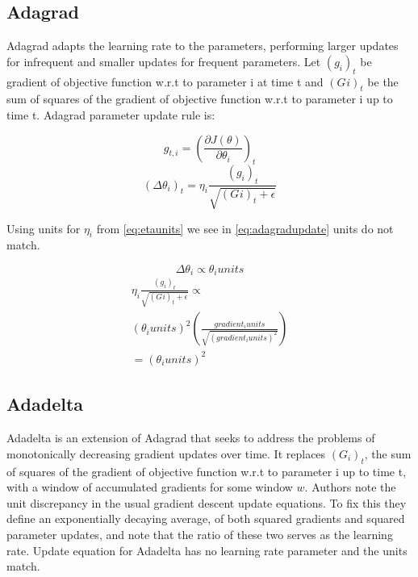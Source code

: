 \documentclass{article}
\begin{document}
\subsection{Adagrad}
	Adagrad \cite{journals/jmlr/DuchiHS11} adapts the learning rate to the parameters, performing larger updates for infrequent and smaller updates for frequent parameters. Let $(g_i)_{t}$ be gradient of objective function w.r.t to parameter i at time t and $(G_{}i)_{t}$ be the sum of squares of the gradient of objective function w.r.t to parameter i up to time t. Adagrad parameter update rule is:
	
	\begin{center} 
		\begin{equation} g_{t,i} =  (\frac {\partial J(\theta)} {\partial \theta_{i}})_{t}   \end{equation}  
		\begin{equation} (\Delta \theta_{i})_{t} = \eta_{i} \frac {(g_i)_{t}} {\sqrt{(G_{}i)_{t} + \epsilon}} 	\label{eq:adagradupdate} \end{equation}
    \end{center}	 
	
	Using units for $\eta_{i}$ from \ref{eq:etaunits} we see in \ref{eq:adagradupdate} units do not match.
	
	 \begin{center} 
	 	\begin{equation}  \Delta \theta_{i} \propto \theta_{i} units \end{equation}  
	 	\begin{equation} 
	 	\begin{split}
	 		\eta_{i} \frac {(g_i)_{t}} {\sqrt{(G_{}i)_{t} + \epsilon}} \propto \\
	 		(\theta_{i} units)^{2} (\frac{gradient_{i} units}{\sqrt{(gradient_{i} units)^{2}}}) \\
	 		= (\theta_{i} units)^{2} 
	 	\end{split}
	 	\end{equation}
	 \end{center}

\subsection{Adadelta}
	Adadelta \cite{DBLP:journals/corr/abs-1212-5701} is an extension of Adagrad that seeks to address the problems of monotonically decreasing gradient updates over time. It replaces $(G_{i})_{t}$, the sum of squares of the gradient of objective function w.r.t to parameter i up to time t, with a window of accumulated gradients for some window $w$. Authors note the unit discrepancy in the usual gradient descent update equations. To fix this they define an exponentially decaying average, of both squared gradients and squared parameter updates, and note that the ratio of these two serves as the learning rate. Update equation for Adadelta has no learning rate parameter and the units match.
	
\end{document}

